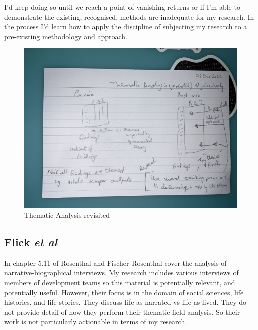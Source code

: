 I'd keep doing so until we reach a point of vanishing returns or if I'm able to demonstrate the existing, recognised, methods are inadequate for my research. In the process I'd learn how to apply the discipline of subjecting my research to a pre-existing methodology and approach.

\begin{figure}
    \centering
    \includegraphics{images/rough-sketches/thematic-analysis-revisited-sketch.jpeg}
    \caption{Thematic Analysis revisited}
    \label{fig:thematic-analysis-revisited-sketch}
\end{figure}


\subsection{Flick \emph{et al}}
In chapter 5.11 of  Rosenthal and Fischer-Rosenthal cover the analysis of narrative-biographical interviews. My research includes various interviews of members of development teams so this material is potentially relevant, and potentially useful.
However, their focus is in the domain of social sciences, life histories, and life-stories. They discuss life-as-narrated vs life-as-lived. They do not provide detail of how they perform their thematic field analysis. So their work is not particularly actionable in terms of my research.
